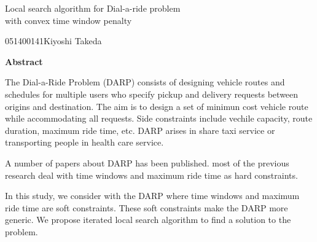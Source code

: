 

\newpage
\begin{center}{\LARGE Local  search algorithm for Dial-a-ride problem\\ with convex time window penalty}\\[0.5cm]
\end{center}
\hfill {\large 051400141\qquad Kiyoshi Takeda}\\[0.5cm]
\begin{center}
{\large \bf Abstract}\\
\end{center}
The Dial-a-Ride Problem (DARP) consists of designing vehicle routes and schedules for multiple users who specify pickup and delivery requests between origins and destination. The aim is to design a set of minimun cost vehicle route while accommodating all requests. Side constraints include vechile capacity, route duration, maximum ride time, etc. DARP arises in share taxi service or transporting people in health care service.

A number of papers about DARP has been published. most of the previous research deal with time windows and maximum ride time as hard constraints.

In this study, we consider with the DARP where time windows and maximum ride time are soft constraints. These soft constraints make the DARP more generic. We propose iterated local search algorithm to find a solution to the problem.
